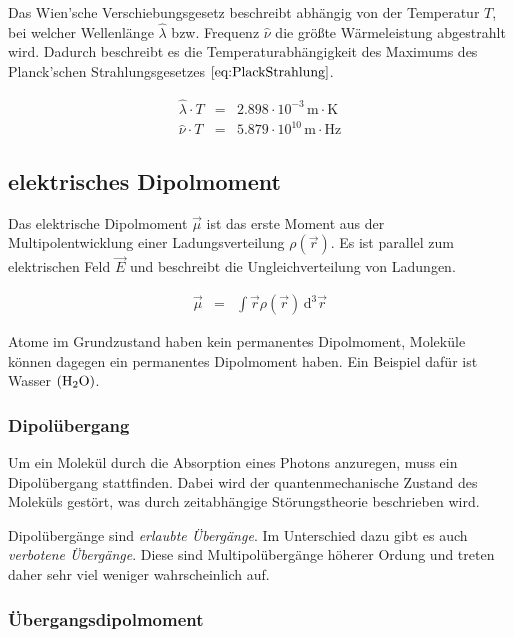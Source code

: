 \documentclass[12pt,a4paper]{scrartcl}
\numberwithin{equation}{section} %
\begin{document}
Das Wien'sche Verschiebungsgesetz beschreibt abhängig von der Temperatur $T$, bei welcher Wellenlänge $\hat{\lambda}$ bzw. Frequenz $\hat{\nu}$ die größte Wärmeleistung abgestrahlt wird. Dadurch beschreibt es die Temperaturabhängigkeit des Maximums des Planck'schen Strahlungsgesetzes $\eqref{eq:PlackStrahlung}$.

\begin{eqnarray}
    \hat{\lambda}\cdot T &=& 2.898\cdot10^{-3}\mathrm{\,m\cdot K}
        \label{eq:WienLambda}\\
    \hat{\nu}\cdot T &=& 5.879\cdot10^{10} \mathrm{\,m\cdot Hz}
        \label{eq:WienNu}
\end{eqnarray}

\hypertarget{elektrisches-dipolmoment}{%
\subsection{elektrisches Dipolmoment}\label{elektrisches-dipolmoment}}

Das elektrische Dipolmoment $\vec \mu$ ist das erste Moment aus der Multipolentwicklung einer Ladungsverteilung $\rho(\vec r)$. \cite{Dipolmoment} Es ist parallel zum elektrischen Feld $\vec E$ und beschreibt die Ungleichverteilung von Ladungen.

\begin{eqnarray}
    \vec \mu &=& \int \vec r \rho(\vec r) \,\mathrm d^3\vec r
\end{eqnarray}

\noindent
Atome im Grundzustand haben kein permanentes Dipolmoment, Moleküle können dagegen ein permanentes Dipolmoment haben. Ein Beispiel dafür ist Wasser $(\ce{H_2O})$.

\hypertarget{dipoluxfcbergang}{%
\subsubsection{Dipolübergang}\label{dipoluxfcbergang}}

Um ein Molekül durch die Absorption eines Photons anzuregen, muss ein Dipolübergang stattfinden. Dabei wird der quantenmechanische Zustand des Moleküls gestört, was durch zeitabhängige Störungstheorie beschrieben wird. \cite{Hinderer}

Dipolübergänge sind \emph{erlaubte Übergänge}. Im Unterschied dazu gibt es auch \emph{verbotene Übergänge}. Diese sind Multipolübergänge höherer Ordung und treten daher sehr viel weniger wahrscheinlich auf.

\hypertarget{uxfcbergangsdipolmoment}{%
\subsubsection{Übergangsdipolmoment}\label{uxfcbergangsdipolmoment}}
\end{document}

